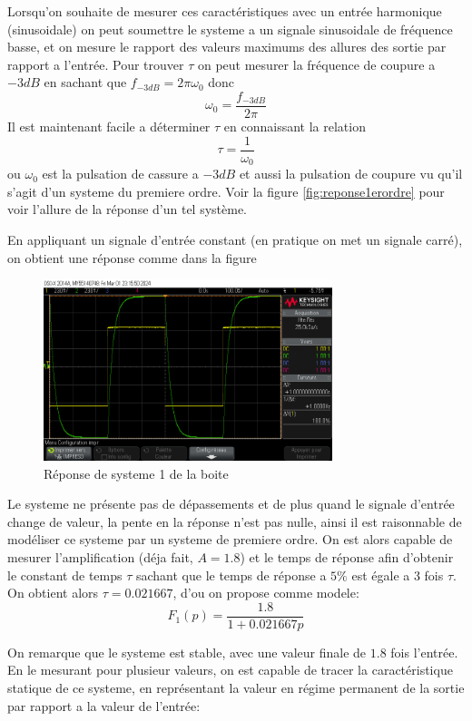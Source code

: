 \documentclass[12pt, a4paper]{report}
\begin{document}
Lorsqu'on souhaite de mesurer ces caractéristiques avec un entrée harmonique (sinusoidale) on peut soumettre le systeme
a un signale sinusoidale de fréquence basse, et on mesure le rapport des valeurs maximums des allures des sortie par rapport a 
l'entrée. Pour trouver $\tau$ on peut mesurer la fréquence de coupure a $-3dB$ en sachant que 
$f_{-3dB} = 2 \pi \omega_{0}$ donc
\[
    \omega_{0} = \frac{f_{-3dB}}{2 \pi}
\]
Il est maintenant facile a déterminer $\tau$ en connaissant la relation
\[
    \tau = \frac{1}{\omega_{0}}
\]
ou $\omega_{0}$ est la pulsation de cassure a $-3dB$ et aussi la pulsation de coupure vu qu'il s'agit 
d'un systeme du premiere ordre. Voir la figure \ref{fig:reponse1erordre} 
pour voir l'allure de la réponse
d'un tel système.

En appliquant un signale d'entrée constant (en pratique on met un signale carré), on obtient une réponse
comme dans la figure 

\begin{figure}[h]
    \centering
    \includegraphics[width=0.75\textwidth]{mesureA1.png}
    \caption{Réponse de systeme 1 de la boite}
    \label{fig:reponse1ersys}
\end{figure}

Le systeme ne présente pas de dépassements et de plus quand le signale d'entrée change de valeur, la pente
en la réponse n'est pas nulle, ainsi il est raisonnable de modéliser ce systeme par un systeme de premiere ordre.
On est alors capable de mesurer l'amplification (déja fait, $A = 1.8$) et le temps de réponse afin d'obtenir le constant de temps $\tau$
sachant que le temps de réponse a $5\%$ est égale a 3 fois $\tau$. On obtient alors $\tau = 0.021667$, d'ou on propose comme modele:
\[
    F_1(p) = \frac{1.8}{1 + 0.021667p}  
\]

On remarque que le systeme est stable, avec une valeur finale de $1.8$ fois l'entrée. En le mesurant pour plusieur valeurs,
on est capable de tracer la caractéristique statique de ce systeme, en représentant la valeur en régime permanent de la sortie par rapport 
a la valeur de l'entrée:
\end{document}
